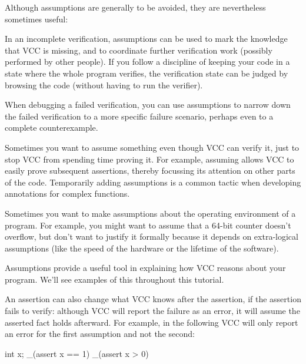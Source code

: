 \begin{note}
Although assumptions are generally to be avoided, they are nevertheless
sometimes useful:
\begin{inparaenum}
\item In an incomplete verification, assumptions can be used to mark
  the knowledge that VCC is missing, and to coordinate further
  verification work (possibly performed by other people). If you
  follow a discipline of keeping your code in a state where the whole 
  program verifies, the verification state can be judged by browsing
  the code (without having to run the verifier).

\item When debugging a failed verification, you can use assumptions to
  narrow down the failed verification to a more specific failure
  scenario, perhaps even to a complete counterexample. 

\item Sometimes you want to assume something even though VCC can
  verify it, just to stop VCC from spending time proving it. For
  example, assuming \vcc{\false} allows VCC to 
  easily prove subsequent assertions, thereby focussing its
  attention on other parts of the code. Temporarily adding assumptions
  is a common tactic when developing annotations for complex functions.

\item Sometimes you want to make assumptions about the operating
  environment of a program. For example, you might want to assume that
  a 64-bit counter doesn't overflow, but don't want to justify it
  formally because it depends on extra-logical assumptions (like the
  speed of the hardware or the lifetime of the software). 

\item Assumptions provide a useful tool in explaining how VCC
  reasons about your program. We'll see examples of this throughout
  this tutorial.
\end{inparaenum}
\end{note}

An assertion can also change what VCC knows after the assertion, if
the assertion fails to verify: although VCC will report the failure as an error,
it will assume the asserted fact holds afterward. For example, in the following
VCC will only report an error for the first assumption and not the second:
\begin{VCC}
int x;
_(assert x == 1)
_(assert x > 0)
\end{VCC}

